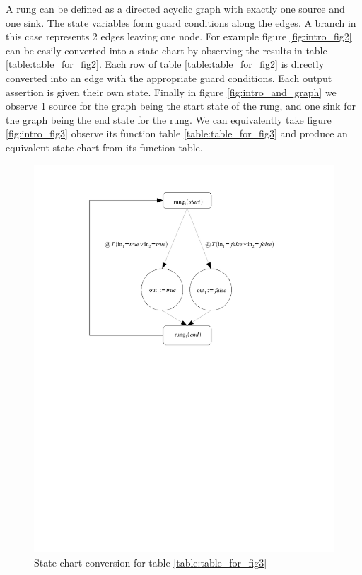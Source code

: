 A rung can be defined as a directed acyclic graph with exactly one source and one sink. The state variables form guard conditions along the edges. A branch in this case represents 2 edges leaving one node. For example figure \ref{fig:intro_fig2}
can be easily converted into a state chart by observing the results in table \ref{table:table_for_fig2}. 
Each row of table \ref{table:table_for_fig2} is directly converted into an edge with the appropriate guard conditions.
Each output assertion is given their own state. Finally in figure \ref{fig:intro_and_graph} we observe 1 source for the
graph being the start state of the rung, and one sink for the graph being the end state for the rung. We can equivalently take figure \ref{fig:intro_fig3} observe its function table \ref{table:table_for_fig3} and produce an equivalent state chart from its function table.

\pagebreak[3]

\begin{figure}[htp]
    \centering
    \includegraphics[trim= 00mm 140mm 40mm 10mm, clip, width=\imgmed]{./images/intro_or_graph.pdf} %
    \caption{State chart conversion for table \ref{table:table_for_fig3}}
    \label{fig:intro_or_graph}
\end{figure}

